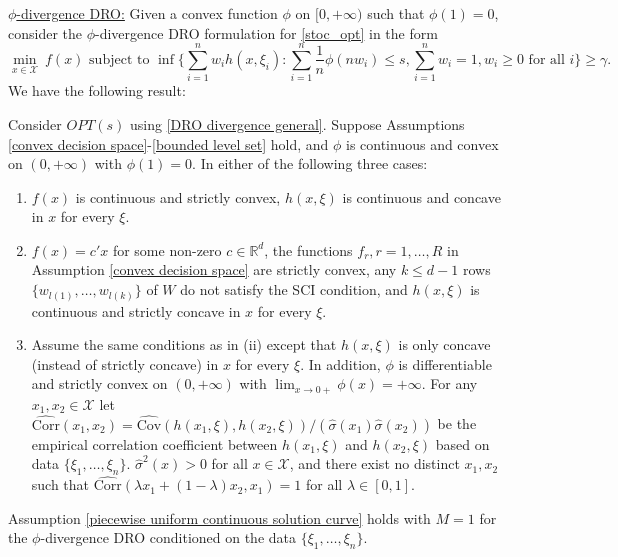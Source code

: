 \documentclass[mnsc,blindrev]{informs4} %
\newcommand{\R}{\mathbb{R}}
\begin{document}
\noindent\underline{$\phi$-divergence DRO:} Given a convex function $\phi$ on $[0,+\infty)$ such that $\phi(1)=0$, consider the $\phi$-divergence DRO formulation for \eqref{stoc_opt} in the form
\begin{equation}\label{DRO divergence general}
\min_{x\in\mathcal X}\ f(x)\text{\ \ subject to\ \ }\inf\Big\{\sum_{i=1}^nw_ih(x,\xi_i):\sum_{i=1}^n\frac{1}{n}\phi(nw_i)\leq s,\sum_{i=1}^nw_i=1,w_i\geq 0\text{ for all } i\Big\}\geq \gamma.
\end{equation}
We have the following result:
\begin{theorem}
\label{continuity of phi DRO}
Consider $OPT(s)$ using \eqref{DRO divergence general}. Suppose Assumptions \ref{convex decision space}-\ref{bounded level set} hold, and $\phi$ is continuous and convex on $(0,+\infty)$ with $\phi(1)=0$. In either of the following three cases:
\begin{enumerate}
\item[i.]$f(x)$ is continuous and strictly convex, $h(x,\xi)$ is continuous and concave in $x$ for every $\xi$.
\item[ii.]$f(x)=c'x$ for some non-zero $c\in\R^d$, the functions $f_r,r=1,\ldots,R$ in Assumption \ref{convex decision space} are strictly convex, any $k\leq d-1$ rows $\{w_{l(1)},\ldots,w_{l(k)}\}$ of $W$ do not satisfy the SCI condition, and $h(x,\xi)$ is continuous and strictly concave in $x$ for every $\xi$.
\item[iii.]Assume the same conditions as in (ii) except that $h(x,\xi)$ is only concave (instead of strictly concave) in $x$ for every $\xi$. In addition, $\phi$ is differentiable and strictly convex on $(0,+\infty)$ with $\lim_{x\to 0+}\phi(x)=+\infty$. For any $x_1,x_2\in \mathcal X$ let $\widehat{\mathrm{Corr}}(x_1,x_2)=\widehat{\mathrm{Cov}}(h(x_1,\xi),h(x_2,\xi))/(\hat\sigma(x_1)\hat\sigma(x_2))$ be the empirical correlation coefficient between $h(x_1,\xi)$ and $h(x_2,\xi)$ based on data $\{\xi_1,\ldots,\xi_n\}$. $\hat\sigma^2(x)>0$ for all $x\in\mathcal X$, and there exist no distinct $x_1, x_2$ such that $\widehat{\mathrm{Corr}}(\lambda x_1+(1-\lambda)x_2,x_1)=1$ for all $\lambda\in[0,1]$.
\end{enumerate}
Assumption \ref{piecewise uniform continuous solution curve} holds with $M=1$ for the $\phi$-divergence DRO conditioned on the data $\{\xi_1,\ldots,\xi_n\}$.
\end{theorem}
\end{document}
